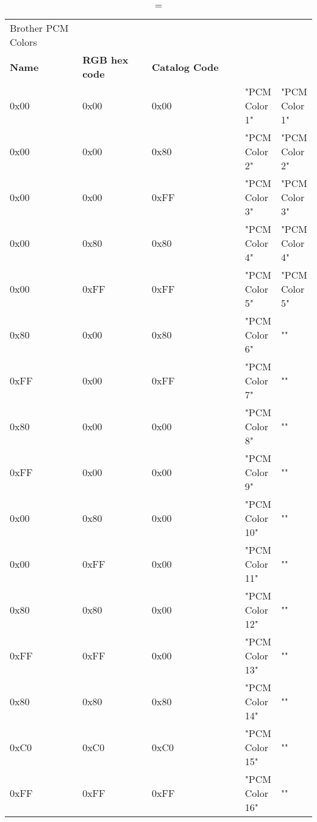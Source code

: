 
\begin{longtable}{p{0.3\linewidth} p{0.3\linewidth} p{0.4\linewidth}}
\caption = {Brother PCM Colors}
\label{tblr:pcm}\\
\textbf{Name} & \textbf{RGB hex code} & \textbf{Catalog Code} \\
0x00 &  0x00 &  0x00 &  "PCM Color 1" &  "PCM Color 1"\\
0x00 &  0x00 &  0x80 &  "PCM Color 2" &  "PCM Color 2"\\
0x00 &  0x00 &  0xFF &  "PCM Color 3" &  "PCM Color 3"\\
0x00 &  0x80 &  0x80 &  "PCM Color 4" &  "PCM Color 4"\\
0x00 &  0xFF &  0xFF &  "PCM Color 5" &  "PCM Color 5"\\
0x80 &  0x00 &  0x80 &  "PCM Color 6" &  ""\\
0xFF &  0x00 &  0xFF &  "PCM Color 7" &  ""\\
0x80 &  0x00 &  0x00 &  "PCM Color 8" &  ""\\
0xFF &  0x00 &  0x00 &  "PCM Color 9" &  ""\\
0x00 &  0x80 &  0x00 &  "PCM Color 10" &  ""\\
0x00 &  0xFF &  0x00 &  "PCM Color 11" &  ""\\
0x80 &  0x80 &  0x00 &  "PCM Color 12" &  ""\\
0xFF &  0xFF &  0x00 &  "PCM Color 13" &  ""\\
0x80 &  0x80 &  0x80 &  "PCM Color 14" &  ""\\
0xC0 &  0xC0 &  0xC0 &  "PCM Color 15" &  ""\\
0xFF &  0xFF &  0xFF &  "PCM Color 16" &  ""\\

\end{longtable}
